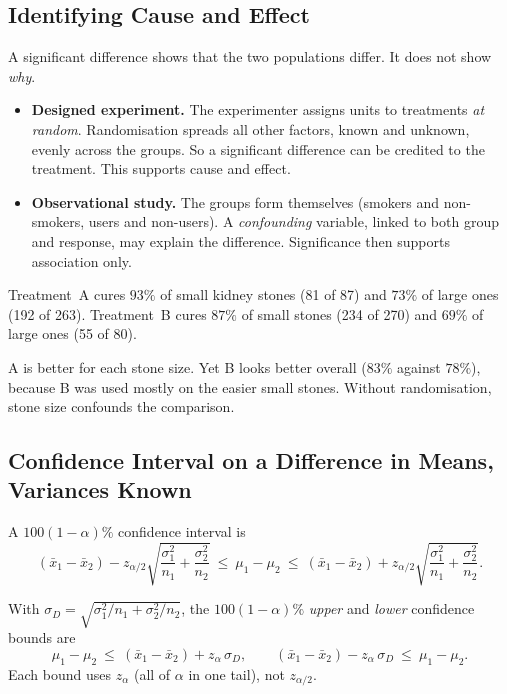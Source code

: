 \subsection{Identifying Cause and Effect}

A significant difference shows that the two populations differ. It does not show \emph{why}.

\begin{itemize}
  \item \textbf{Designed experiment.} The experimenter assigns units to treatments \emph{at random}. Randomisation spreads all other factors, known and unknown, evenly across the groups. So a significant difference can be credited to the treatment. This supports cause and effect.
  \item \textbf{Observational study.} The groups form themselves (smokers and non-smokers, users and non-users). A \emph{confounding} variable, linked to both group and response, may explain the difference. Significance then supports association only.
\end{itemize}

\begin{example}
Treatment~A cures $93\%$ of small kidney stones (81 of 87) and $73\%$ of large ones (192 of 263). Treatment~B cures $87\%$ of small stones (234 of 270) and $69\%$ of large ones (55 of 80).

A is better for each stone size. Yet B looks better overall ($83\%$ against $78\%$), because B was used mostly on the easier small stones. Without randomisation, stone size confounds the comparison.
\end{example}

\subsection{Confidence Interval on a Difference in Means, Variances Known}

\begin{theorem}\label{thm:twoz-ci}
A $100(1-\alpha)\%$ confidence interval is
\[ (\bar{x}_1-\bar{x}_2)-z_{\alpha/2}\sqrt{\frac{\sigma_1^2}{n_1}+\frac{\sigma_2^2}{n_2}}\ \le\ \mu_1-\mu_2\ \le\ (\bar{x}_1-\bar{x}_2)+z_{\alpha/2}\sqrt{\frac{\sigma_1^2}{n_1}+\frac{\sigma_2^2}{n_2}}. \]
\end{theorem}

\begin{theorem}\label{thm:twoz-onesided}
With $\sigma_D=\sqrt{\sigma_1^2/n_1+\sigma_2^2/n_2}$, the $100(1-\alpha)\%$ \emph{upper} and \emph{lower} confidence bounds are
\[ \mu_1-\mu_2\ \le\ (\bar{x}_1-\bar{x}_2)+z_{\alpha}\,\sigma_D, \qquad (\bar{x}_1-\bar{x}_2)-z_{\alpha}\,\sigma_D\ \le\ \mu_1-\mu_2. \]
Each bound uses $z_\alpha$ (all of $\alpha$ in one tail), not $z_{\alpha/2}$.
\end{theorem}

